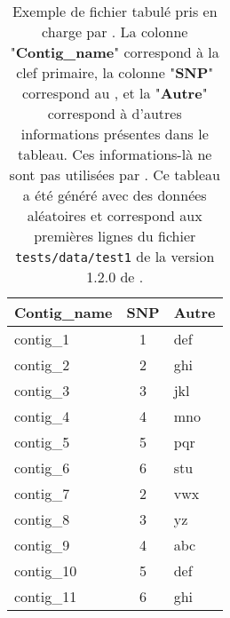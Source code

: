 \documentclass[../main]{subfiles} %
\begin{document}
\addto\extrasfrench{\protected\edef:{\unexpanded\expandafter{:}}}


\begin{table}[ht]
    \centering
    \begin{tabular}{lcl}
        \toprule
        \textbf{Contig\_name} & \textbf{SNP} & \textbf{Autre} \\
        \midrule
        contig\_1  & 1 & def  \\
        contig\_2  & 2 & ghi  \\
        contig\_3  & 3 & jkl  \\
        contig\_4  & 4 & mno  \\
        contig\_5  & 5 & pqr  \\
        contig\_6  & 6 & stu  \\
        contig\_7  & 2 & vwx  \\
        contig\_8  & 3 & yz   \\
        contig\_9  & 4 & abc  \\
        contig\_10 & 5 & def  \\
        contig\_11 & 6 & ghi  \\
        \bottomrule
    \end{tabular}
    \caption{Exemple de fichier tabulé pris en charge par \cite{snpheatmap}. La colonne "\textbf{Contig\_name}" correspond à la clef primaire, la colonne "\textbf{SNP}" correspond au \NbSNP, et la "\textbf{Autre}" correspond à d'autres informations présentes dans le tableau. Ces informations-là ne sont pas utilisées par \cite{snpheatmap}. Ce tableau a été généré avec des données aléatoires et correspond aux premières lignes du fichier \lstinline{tests/data/test1} de la version 1.2.0 de \cite{snpheatmap}.}
    \label{tab:snpTable}
\end{table}
\end{document}
